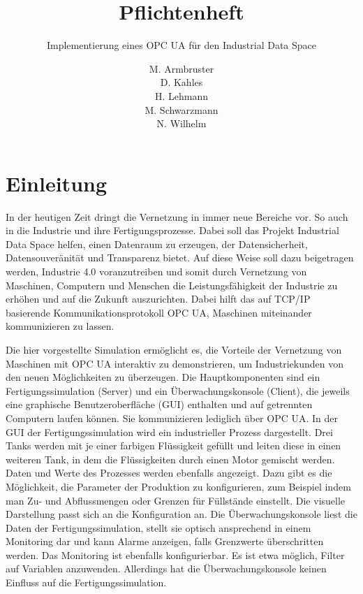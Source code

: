 \documentclass[parskip=full]{scrartcl}
\title{Pflichtenheft}
\subtitle{Implementierung eines OPC UA \glslink{Systemadapter}{Systemadapters} für den \gls{Industrial Data Space}}
\author{
    M. Armbruster\\
    D. Kahles\\
    H. Lehmann\\
    M. Schwarzmann\\
    N. Wilhelm
}
\begin{document}
\maketitle
\pagebreak
\tableofcontents
\pagebreak

\section{Einleitung}
In der heutigen Zeit dringt die Vernetzung in immer neue Bereiche vor. So auch in die Industrie und ihre Fertigungsprozesse.
Dabei soll das Projekt Industrial Data Space helfen, einen Datenraum zu erzeugen, der Datensicherheit, Datensouveränität und
Transparenz bietet. Auf diese Weise soll dazu beigetragen werden, Industrie 4.0 voranzutreiben und somit durch Vernetzung von
Maschinen, Computern und Menschen die Leistungsfähigkeit der Industrie zu erhöhen und auf die Zukunft auszurichten.
Dabei hilft das auf TCP/IP basierende Kommunikationsprotokoll OPC UA, Maschinen miteinander kommunizieren zu lassen.

Die hier vorgestellte Simulation ermöglicht es, die Vorteile der Vernetzung von Maschinen mit OPC UA interaktiv zu demonstrieren, um Industriekunden von den neuen Möglichkeiten zu überzeugen.
Die Hauptkomponenten sind ein Fertigungssimulation (Server) und ein Überwachungskonsole (Client),
die jeweils eine graphische Benutzeroberfläche (GUI) enthalten und auf getrennten Computern laufen können.
Sie kommunizieren lediglich über OPC UA.
In der GUI der Fertigungssimulation wird ein industrieller Prozess dargestellt.
Drei Tanks werden mit je einer farbigen Flüssigkeit gefüllt und leiten diese in einen weiteren Tank,
in dem die Flüssigkeiten durch einen Motor gemischt werden. Daten und Werte des Prozesses werden ebenfalls angezeigt. Dazu gibt es
die Möglichkeit, die Parameter der Produktion zu konfigurieren, zum Beispiel indem man Zu- und Abflussmengen oder Grenzen für Füllstände einstellt. Die visuelle Darstellung passt sich an die Konfiguration an.
Die Überwachungskonsole liest die Daten der Fertigungssimulation, stellt sie optisch ansprechend in einem Monitoring dar
und kann Alarme anzeigen, falls Grenzwerte überschritten werden. Das Monitoring ist ebenfalls konfigurierbar. Es ist etwa möglich, Filter auf Variablen anzuwenden. Allerdings hat die Überwachungskonsole keinen Einfluss auf die Fertigungssimulation.

\pagebreak
\end{document}
